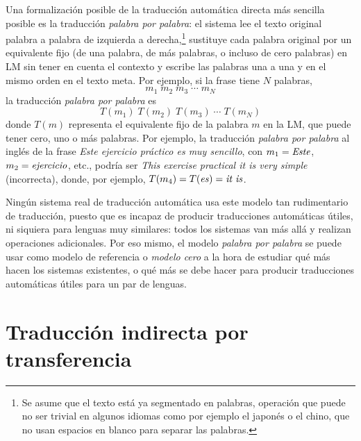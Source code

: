 \label{pg:mpm} Una formalización posible de la traducción automática directa más sencilla posible es la traducción \emph{palabra por palabra}: el sistema lee el texto original palabra a palabra de izquierda a derecha,\footnote{Se asume que el texto está ya segmentado en palabras, operación que puede no ser trivial en algunos idiomas como por ejemplo el japonés o el chino, que no usan espacios en blanco para separar las palabras.} sustituye cada palabra original por un equivalente fijo (de una palabra, de más palabras, o incluso de cero palabras) en LM sin tener en cuenta el contexto y escribe las palabras una a una y en el mismo orden en el texto meta. Por ejemplo, si la frase tiene \(N\) palabras, \begin{displaymath} m_1\; m_2\; m_3\; \cdots \;m_N \end{displaymath} la traducción \emph{palabra por palabra} es \begin{displaymath} T(m_1)\; T(m_2)\; T(m_3)\; \cdots\; T(m_N) \end{displaymath} donde \(T(m)\) representa el equivalente fijo de la palabra \(m\) en la LM, que puede tener cero, uno o más palabras. Por ejemplo, la traducción \emph{palabra por palabra} al inglés de la frase \emph{Este ejercicio práctico es muy sencillo}, con \(m_1=\mbox{\emph{Este}}\), \(m_2=\mbox{\emph{ejercicio}}\), etc., podría ser \emph{This exercise practical it is very simple} (incorrecta), donde, por ejemplo, \(T(m_4)=T(\mbox{\emph{es}})=\mbox{\emph{it is}}\). 

Ningún sistema real de traducción automática usa este modelo tan rudimentario de traducción, puesto que es incapaz de producir traducciones automáticas útiles, ni siquiera para lenguas muy similares: todos los sistemas van más allá y realizan operaciones adicionales. Por eso mismo, el modelo \emph{palabra por palabra} se puede usar como modelo de referencia o \emph{modelo cero} a la hora de estudiar qué más hacen los sistemas existentes, o qué más se debe hacer para producir traducciones automáticas útiles para un par de lenguas. 

\section{Traducción indirecta por transferencia} \label{ss:classtrans} 

